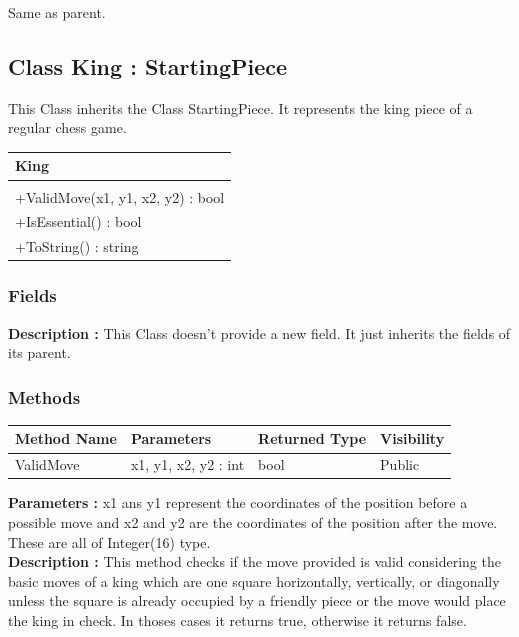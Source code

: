 \documentclass[12pt]{article}
\begin{document}
Same as parent.
\newpage


\subsection{Class King : StartingPiece}

This Class inherits the Class StartingPiece. It represents the king 
piece of a regular chess game.
\begin{table}[H]
    \begin{tabular}{|l|}
    \hline
    \cellcolor[HTML]{C0C0C0}\textbf{King} \\ \hline
    \cellcolor[HTML]{EFEFEF}                    \\ \hline
    +ValidMove(x1, y1, x2, y2) : bool           \\ \hline
    +IsEssential() : bool                       \\ \hline
    +ToString() : string                        \\ \hline
    \end{tabular}
\end{table}

\subsubsection{Fields}

\textbf{Description :} This Class doesn't provide a new field. It just
inherits the fields of its parent.

\subsubsection{Methods}

\begin{table}[H]
    \begin{tabular}{|l|l|l|l|}
    \hline
    \rowcolor[HTML]{EFEFEF} 
    \cellcolor[HTML]{EFEFEF}\textbf{Method Name} & \textbf{Parameters}  & \textbf{Returned Type} & \textbf{Visibility} \\ \hline
    ValidMove                          & x1, y1, x2, y2 : int & bool                   & Public              \\ \hline
    \end{tabular}
\end{table}

\textbf{Parameters :} x1 ans y1 represent the coordinates of the position before a possible move
and x2 and y2 are the coordinates of the position after the move. These are all of Integer(16) type.
\\
\textbf{Description :} This method checks if the move provided is
valid considering the basic moves of a king which are one square
horizontally, vertically, or diagonally unless the square is already
occupied by a friendly piece or the move would place the king in
check. In thoses cases it returns true, otherwise it returns false.
\end{document}
